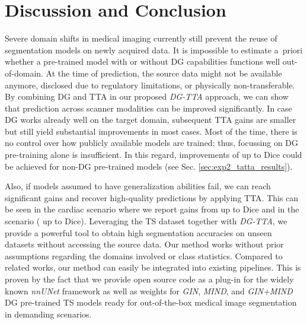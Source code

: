 \section{Discussion and Conclusion}
    Severe domain shifts in medical imaging currently still prevent the reuse of segmentation models on newly acquired data. It is impossible to estimate \mbox{a priori} whether a pre-trained model with or without DG capabilities functions well out-of-domain. At the time of prediction, the source data might not be available anymore, disclosed due to regulatory limitations, or physically non-transferable. By combining DG and TTA in our proposed \emph{DG-TTA} approach, we can show that prediction across scanner modalities can be improved significantly.
    In case DG works already well on the target domain, subsequent TTA gains are smaller but still yield substantial improvements in most cases. Most of the time, there is no control over how publicly available models are trained; thus, focussing on DG pre-training alone is insufficient. In this regard, improvements of up to  Dice could be achieved for non-DG pre-trained models (see Sec. \ref{sec:exp2_tatta_results}).

    Also, if models assumed to have generalization abilities fail, we can reach significant gains and recover high-quality predictions by applying TTA. This can be seen in the cardiac  scenario where we report gains from  up to  Dice and in the  scenario ( up to  Dice).
    Leveraging the TS dataset \cite{wasserthal2023totalsegmentator} together with \emph{DG-TTA}, we provide a powerful tool to obtain high segmentation accuracies on unseen datasets without accessing the source data.
    Our method works without prior assumptions regarding the domains involved or class statistics. Compared to related works, our method can easily be integrated into existing pipelines. This is proven by the fact that we provide open source code as a plug-in for the widely known \emph{nnUNet} framework as well as weights for \emph{GIN}, \emph{MIND}, and \emph{GIN+MIND} DG pre-trained TS models ready for out-of-the-box medical image segmentation in demanding scenarios.